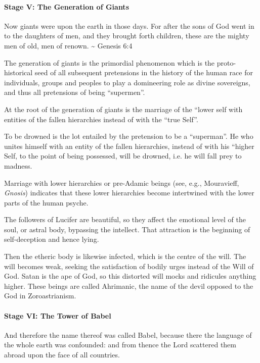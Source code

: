 \paragraph{Stage V: The Generation of Giants}
\begin{quotex}
Now giants were upon the earth in those days. For after the sons of God went in to the daughters of men, and they
brought forth children, these are the mighty men of old, men of renown. \~{} Genesis 6:4

The generation of giants is the primordial phenomenon which is the proto-historical seed of all subsequent pretensions
in the history of the human race for individuals, groups and peoples to play a domineering role as divine sovereigns,
and thus all pretensions of being “supermen”. 

\end{quotex}
At the root of the generation of giants is the marriage of the “lower self with entities of the fallen hierarchies
instead of with the “true Self”.

\begin{quotex}
To be drowned is the lot entailed by the pretension to be a “superman”. He who unites himself with an entity of the
fallen hierarchies, instead of with his “higher Self, to the point of being possessed, will be drowned, i.e. he will
fall prey to madness. 

\end{quotex}
Marriage with lower hierarchies or pre-Adamic beings (see, e.g., Mouravieff, \emph{Gnosis}) indicates that these lower
hierarchies become intertwined with the lower parts of the human psyche.

The followers of Lucifer are beautiful, so they affect the emotional level of the soul, or astral body, bypassing the
intellect. That attraction is the beginning of self-deception and hence lying.

Then the etheric body is likewise infected, which is the centre of the will. The will becomes weak, seeking the
satisfaction of bodily urges instead of the Will of God. Satan is the ape of God, so this distorted will mocks and
ridicules anything higher. These beings are called Ahrimanic, the name of the devil opposed to the God in
Zoroastrianism.

\paragraph{Stage VI: The Tower of Babel}
\begin{quotex}
And therefore the name thereof was called Babel, because there the language of the whole earth was confounded: and from
thence the Lord scattered them abroad upon the face of all countries. 
\end{quotex}

